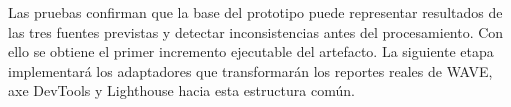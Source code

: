 Las pruebas confirman que la base del prototipo puede representar resultados de
las tres fuentes previstas y detectar inconsistencias antes del procesamiento.
Con ello se obtiene el primer incremento ejecutable del artefacto. La siguiente
etapa implementará los adaptadores que transformarán los reportes reales de
WAVE, axe DevTools y Lighthouse hacia esta estructura común.
